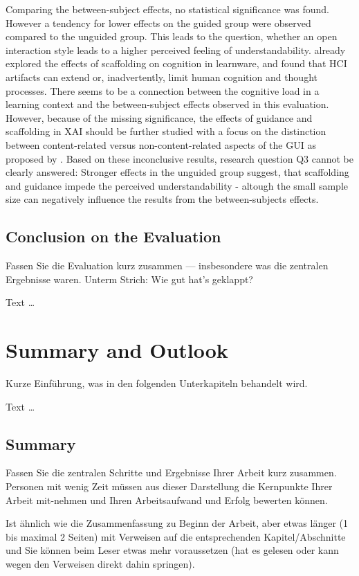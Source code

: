 \documentclass[11pt,a4paper,english]{scrreprt}
\newenvironment{comment}
  {\par\medskip
   \begingroup\color{olive}%
   }
 {\endgroup
  \medskip}
\begin{document}
Comparing the between-subject effects, no statistical significance was found. However a tendency for lower effects on the guided group were observed compared to the unguided group. This leads to the question, whether an open interaction style leads to a higher perceived feeling of understandability. \textcite{sedig_role_2001} already explored the effects of scaffolding on cognition in learnware, and found that HCI artifacts can extend or, inadvertently, limit human cognition and thought processes. There seems to be a connection between the cognitive load in a learning context and the between-subject effects observed in this evaluation. However, because of the missing significance, the effects of guidance and scaffolding in XAI should be further studied with a focus on the distinction between content-related versus non-content-related aspects of the GUI as proposed by \textcite{sedig_role_2001}. Based on these inconclusive results, research question Q3 cannot be clearly answered: Stronger effects in the unguided group suggest, that scaffolding and guidance impede the perceived understandability - altough the small sample size can negatively influence the results from the between-subjects effects.

\section{Conclusion on the Evaluation}
\begin{comment}
Fassen Sie die Evaluation kurz zusammen — insbesondere was die zentralen Ergebnisse waren. Unterm Strich: Wie gut hat's geklappt?
\end{comment}

Text \dots

\newpage
\chapter{Summary and Outlook}
\begin{comment}
Kurze Einführung, was in den folgenden Unterkapiteln behandelt wird.
\end{comment}

Text \dots

\section{Summary}
\begin{comment}
Fassen Sie die zentralen Schritte und Ergebnisse Ihrer Arbeit kurz zusammen. Personen mit wenig Zeit müssen aus dieser Darstellung die Kernpunkte Ihrer Arbeit mit-nehmen und Ihren Arbeitsaufwand und Erfolg bewerten können.

Ist ähnlich wie die Zusammenfassung zu Beginn der Arbeit, aber etwas länger (1 bis maximal 2 Seiten) mit Verweisen auf die entsprechenden Kapitel/Abschnitte und Sie können beim Leser etwas mehr voraussetzen (hat es gelesen oder kann wegen den Verweisen direkt dahin springen).
\end{comment}
\end{document}
